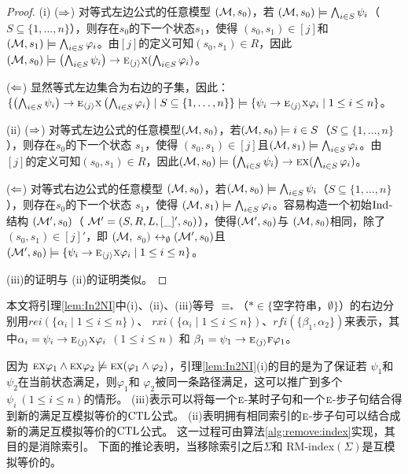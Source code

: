 \begin{proof}
	(i) ($\Rightarrow$) 对等式左边公式的任意模型 $({\cal M},s_0)$，若 $({\cal M},s_0) \models \bigwedge_{i\in S}\psi_i$（ $S \subseteq  \{1, \dots, n\}$），则存在$s_0$的下一个状态$s_1$，使得 $(s_0, s_1) \in [j]$和 $({\cal M}, s_1) \models \bigwedge_{i\in S} \varphi_i$。由$[j]$的定义可知$(s_0, s_1) \in R$，因此$({\cal M}, s_0) \models \left(\bigwedge_{i\in S}\psi_i\right) \rightarrow \textsc{e}_{{\langle{j}\rangle}} \textsc{x} (\bigwedge_{i\in S} \varphi_i)$。 %
	
	($\Leftarrow$)  显然等式左边集合为右边的子集，因此：
	$\{\left(\bigwedge_{i\in S}\psi_i\right)\rightarrow \textsc{e}_{{\langle{j}\rangle}} \textsc{x} \left(\bigwedge_{i\in S}\varphi_i\right)\mid S\subseteq\{1,\dots, n\}\} \models \{\psi_i\rightarrow \textsc{e}_{{\langle{j}\rangle}} \textsc{x} \varphi_i \mid 1\le i\le n\}$。
	
	(ii) ($\Rightarrow$) 对等式左边公式的任意模型$({\cal M},s_0)$，若$({\cal M},s_0) \models {i\in S}$（$S \subseteq  \{1, \dots, n\}$），则存在$s_0$的下一个状态 $s_1$，使得 $(s_0, s_1) \in [j]$且$({\cal M}, s_1) \models \bigwedge_{i\in S} \varphi_i$。由 $[j]$的定义可知$(s_0, s_1) \in R$，因此$({\cal M}, s_0) \models \left(\bigwedge_{i\in S}\psi_i\right) \rightarrow \textsc{e} \textsc{x} (\bigwedge_{i\in S} \varphi_i)$。 %
	
	($\Leftarrow$) 对等式右边公式的任意模型 $({\cal M},s_0)$，若$({\cal M},s_0) \models \bigwedge_{i\in S}\psi_i$（$S \subseteq  \{1, \dots, n\}$），则存在$s_0$的下一个状态 $s_1$，使得 $({\cal M}, s_1) \models \bigwedge_{i\in S} \varphi_i$。容易构造一个初始$\textrm{Ind}$-结构 $({\cal M}',s_0)$（ ${\cal M}'=(S,R,L,[\_]',s_0)$），使得$({\cal M}', s_0)$与 $({\cal M}, s_0)$相同，除了 $(s_0, s_1) \in [j]'$，即 $({\cal M},$ $s_0)$ $\leftrightarrow_{\emptyset} ({\cal M}', s_0)$且 $({\cal M}',s_0) \models \{\psi_i\rightarrow \textsc{e}_{{\langle{j}\rangle}} \textsc{x} \varphi_i \mid 1\le i\le n\}$。 
	
	(iii)的证明与 (ii)的证明类似。
\end{proof}


本文将引理\ref{lem:In2NI}中(i)、(ii)、(iii)等号 $\equiv_*$（$* \in \{$空字符串，$\emptyset\}$）的右边分别用$rei(\{\alpha_i\mid 1\le i\le n\})$、
$rxi(\{\alpha_i\mid 1\le i\le n\})$、$rfi(\{\beta_1,\alpha_2\})$来表示，其中$\alpha_i=\psi_i\rightarrow \textsc{e}_{{\langle{j}\rangle}} \textsc{x} \varphi_i$ $(1\le i\le n)$ 和 $\beta_1=\psi_1 \rightarrow \textsc{e}_{{\langle{j}\rangle}}\textsc{f} \varphi_1$。



因为 $\textsc{e}\textsc{x}\varphi_1\land \textsc{e}\textsc{x}\varphi_2\not\models \textsc{e}\textsc{x}(\varphi_1\land\varphi_2)$，引理\ref{lem:In2NI}(i)的目的是为了保证若 $\psi_1$和 $\psi_2$在当前状态满足，则$\varphi_1$和 $\varphi_2$被同一条路径满足，这可以推广到多个 $\psi_i~(1\le i\le n)$的情形。 
(iii)表示可以将每一个$\textsc{e}$-某时子句和一个$\textsc{e}$-步子句结合得到新的满足互模拟等价的$\textrm{CTL}$公式。
(ii)表明拥有相同索引的$\textsc{e}$-步子句可以结合成新的满足互模拟等价的$\textrm{CTL}$公式。
这一过程可由算法\ref{alg:remove:index}实现，其目的是消除索引。
下面的推论表明，当移除索引之后$\Sigma$和 RM-index$(\Sigma)$是互模拟等价的。


